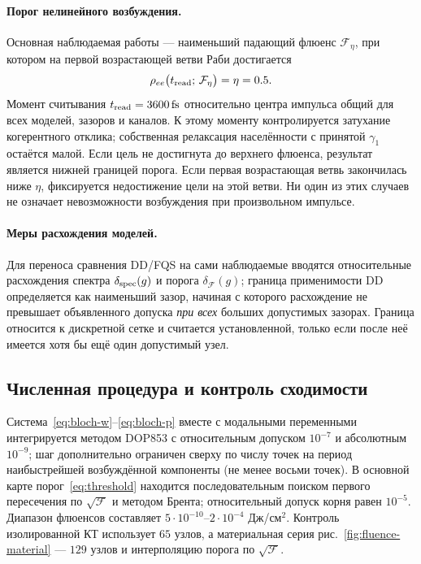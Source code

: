 \paragraph{Порог нелинейного возбуждения.} Основная наблюдаемая работы —
наименьший падающий флюенс $\mathcal{F}_\eta$, при котором на первой
возрастающей ветви Раби достигается
\begin{equation}
  \rho_{ee}\bigl(t_{\rm read};\,\mathcal{F}_\eta\bigr) = \eta = 0.5 .
  \label{eq:threshold}
\end{equation}
Момент считывания $t_{\rm read}=\SI{3600}{\femto\second}$ относительно
центра импульса общий для всех моделей, зазоров и каналов. К этому моменту
контролируется затухание когерентного отклика; собственная релаксация
населённости с принятой $\gamma_1$ остаётся малой.
Если цель не достигнута до верхнего флюенса, результат является нижней
границей порога. Если первая возрастающая ветвь закончилась ниже $\eta$,
фиксируется недостижение цели на этой ветви. Ни один из этих случаев
не означает невозможности возбуждения при произвольном импульсе.

\paragraph{Меры расхождения моделей.} Для переноса сравнения DD/FQS на сами
наблюдаемые вводятся относительные расхождения спектра $\delta_{\rm spec}(g)$ и
порога $\delta_{\mathcal F}(g)$; граница применимости DD определяется как
наименьший зазор, начиная с которого расхождение не превышает объявленного
допуска \emph{при всех} больших допустимых зазорах.
Граница относится к дискретной сетке и считается установленной,
только если после неё имеется хотя бы ещё один допустимый узел.

\subsection{Численная процедура и контроль сходимости}
\label{sec:numerics}

Система~\eqref{eq:bloch-w}--\eqref{eq:bloch-p} вместе с модальными
переменными интегрируется методом DOP853 с относительным допуском $10^{-7}$ и
абсолютным $10^{-9}$; шаг дополнительно ограничен сверху по числу точек на
период наибыстрейшей возбуждённой компоненты (не менее восьми точек).
В основной карте порог~\eqref{eq:threshold} находится последовательным
поиском первого пересечения по $\sqrt{\mathcal F}$ и методом Брента;
относительный допуск корня равен $10^{-5}$. Диапазон флюенсов составляет
$5\cdot10^{-10}$--$2\cdot10^{-4}$ Дж/см$^2$. Контроль изолированной КТ
использует $65$ узлов, а материальная серия рис.~\ref{fig:fluence-material}
--- $129$ узлов и интерполяцию порога по $\sqrt{\mathcal F}$.

